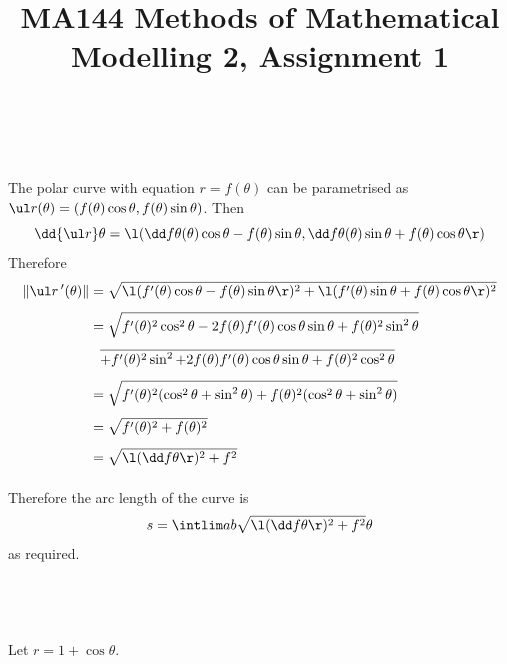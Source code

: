 \documentclass[a4paper]{article}
\title{MA144 Methods of Mathematical Modelling 2, Assignment 1}
\begin{document}
\maketitle

\setlength{\parindent}{0em}
\setlength{\parskip}{1em}


\subsection{~}

The polar curve with equation $r = f(\theta)$ can be parametrised as $\ul r (\theta) = (f(\theta) \cos \theta, f(\theta) \sin \theta)$. Then $$\dd{\ul r}\theta = \l(\dd f\theta (\theta) \cos \theta - f(\theta) \sin \theta, \dd f\theta (\theta) \sin \theta + f(\theta) \cos \theta\r)$$
Therefore \begin{align*}
\| \ul r\,'(\theta) \| &= \sqrt{\l( f'(\theta) \cos \theta - f(\theta) \sin \theta \r)^2 + \l( f'(\theta) \sin \theta + f(\theta) \cos \theta \r)^2}\\[1ex]
&= \sqrt{f'(\theta)^2 \cos^2 \theta - 2 f(\theta) f'(\theta) \cos\theta \sin\theta + f(\theta)^2 \sin^2 \theta}\\[1ex]
&\phantom{=} \overline{+ f'(\theta)^2 \sin^2 + 2 f(\theta) f'(\theta) \cos\theta \sin\theta + f(\theta)^2 \cos^2 \theta}\\[1ex]
&= \sqrt{f'(\theta)^2 (\cos^2 \theta + \sin^2 \theta) + f(\theta)^2 (\cos^2 \theta + \sin^2 \theta)}\\[1ex]
&= \sqrt{f'(\theta)^2 + f(\theta)^2}\\[1ex]
&= \sqrt{\l(\dd f\theta\r)^2 + f^2}\\[1ex]
\end{align*}

Therefore the arc length of the curve is $$s = \intlim ab {\sqrt{\l(\dd f\theta\r)^2 + f^2}}\theta$$ as required.

\subsection{~}

Let $r = 1 + \cos\theta$. %
\end{document}
